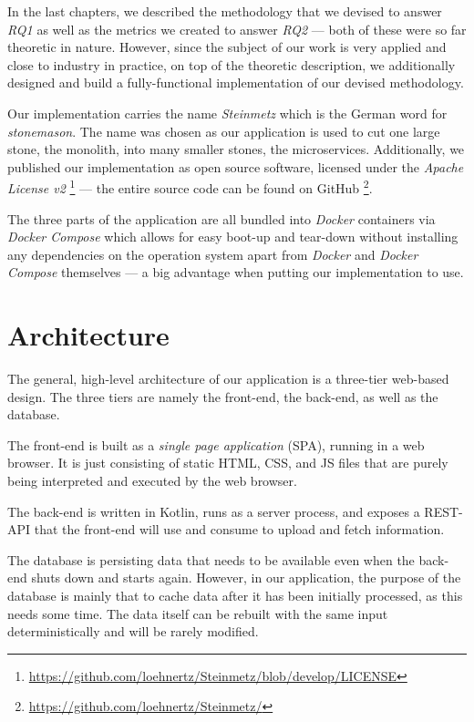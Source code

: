 \documentclass[12pt,a4paper]{report}
\begin{document}
In the last chapters, we described the methodology that we devised to answer
\textit{RQ1} as well as the metrics we created to answer \textit{RQ2} ---
both of these were so far theoretic in nature.
However, since the subject of our work is very applied and close to industry
in practice, on top of the theoretic description, we additionally designed
and build a fully-functional implementation of our devised methodology.

Our implementation carries the name \textit{Steinmetz} which is the German
word for \textit{stonemason}. The name was chosen as our application is used
to cut one large stone, the monolith, into many smaller stones, the microservices.
Additionally, we published our implementation as open source software,
licensed under the \textit{Apache License v2}
\footnote{\url{https://github.com/loehnertz/Steinmetz/blob/develop/LICENSE}} ---
the entire source code can be found on GitHub
\footnote{\url{https://github.com/loehnertz/Steinmetz/}}.

The three parts of the application are all bundled into \textit{Docker} containers
via \textit{Docker Compose} which allows for easy boot-up and tear-down without
installing any dependencies on the operation system apart from \textit{Docker}
and \textit{Docker Compose} themselves \cite{docker} \cite{docker-compose} ---
a big advantage when putting our implementation to use.



\section{Architecture}
The general, high-level architecture of our application is a three-tier
web-based design. The three tiers are namely the front-end, the back-end,
as well as the database.

The front-end is built as a \textit{single page application} (SPA),
running in a web browser. It is just consisting of static HTML, CSS, and JS files
that are purely being interpreted and executed by the web browser.

The back-end is written in Kotlin, runs as a server process, and exposes
a REST-API that the front-end will use and consume to upload and fetch information.

The database is persisting data that needs to be available even when the
back-end shuts down and starts again. However, in our application,
the purpose of the database is mainly that to cache data after it has
been initially processed, as this needs some time. The data itself can be
rebuilt with the same input deterministically and will be rarely modified.
\end{document}
